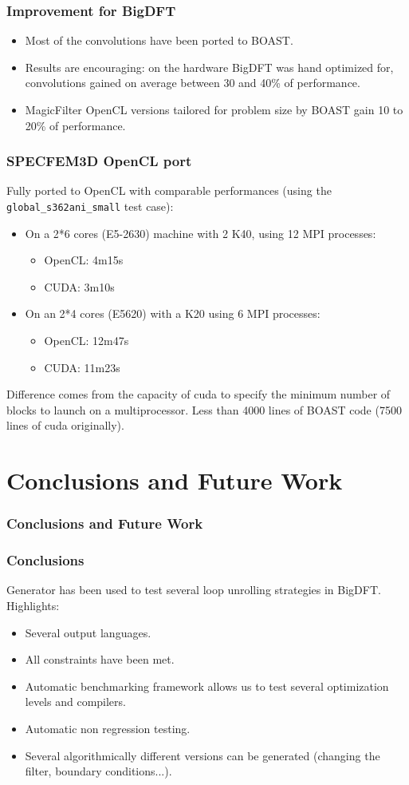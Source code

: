 \documentclass{beamer}
\begin{document}
\begin{frame}
\frametitle{Improvement for BigDFT}
\begin{itemize}
\item Most of the convolutions have been ported to BOAST.
\item Results are encouraging: on the hardware BigDFT was hand optimized for, convolutions gained on average between 30 and 40\% of performance.
\item MagicFilter OpenCL versions tailored for problem size by BOAST gain 10 to 20\% of performance.
\end{itemize}
\end{frame}

\begin{frame}
\frametitle{SPECFEM3D OpenCL port}
Fully ported to OpenCL with comparable performances (using the \texttt{global\_s362ani\_small} test case):
\begin{itemize}
\item On a 2*6 cores (E5-2630) machine with 2 K40, using 12 MPI processes:
\begin{itemize}
\item OpenCL: 4m15s
\item CUDA: 3m10s
\end{itemize}
\item On an 2*4 cores (E5620) with a K20 using 6 MPI processes:
\begin{itemize}
\item OpenCL: 12m47s
\item CUDA: 11m23s
\end{itemize}
\end{itemize}
Difference comes from the capacity of cuda to specify the minimum number of blocks to launch on a multiprocessor.
Less than 4000 lines of BOAST code (7500 lines of cuda originally).
\end{frame}

\section{Conclusions and Future Work}

\begin{frame}
\frametitle{Conclusions and Future Work}
\end{frame}

\begin{frame}
\frametitle{Conclusions}
Generator has been used to test several loop unrolling strategies in BigDFT.\\
Highlights:
\begin{itemize}
\item Several output languages.
\item All constraints have been met.
\item Automatic benchmarking framework allows us to test several optimization levels and compilers.
\item Automatic non regression testing.
\item Several algorithmically different versions can be generated (changing the filter, boundary conditions...).
\end{itemize}
\end{frame}
\end{document}
